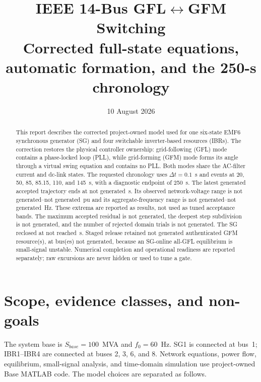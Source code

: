 \documentclass[12pt,a4paper]{article}
\title{\textbf{IEEE 14-Bus GFL$\leftrightarrow$GFM Switching}\\
\large Corrected full-state equations, automatic formation, and the 250-s chronology}
\author{}
\date{10 August 2026}
\newcommand{\RunEnd}{not generated}
\newcommand{\RunVMin}{not generated}
\newcommand{\RunVMax}{not generated}
\newcommand{\RunFMin}{not generated}
\newcommand{\RunFMax}{not generated}
\newcommand{\RunSubdivision}{not generated}
\newcommand{\RunDomainRejects}{not generated}
\newcommand{\RunResidual}{not generated}
\newcommand{\RunReclose}{not reached}
\newcommand{\RunFinalGFMCount}{not generated}
\newcommand{\RunFinalGFMBuses}{not generated}
\begin{document}
\maketitle

\begin{abstract}
This report describes the corrected project-owned model used for one six-state EMF6 synchronous
generator (SG) and four switchable inverter-based resources (IBRs). The correction restores the
physical controller ownership: grid-following (GFL) mode contains a phase-locked loop (PLL), while
grid-forming (GFM) mode forms its angle through a virtual swing equation and contains no PLL.
Both modes share the AC-filter current and dc-link states. The requested chronology uses
$\Delta t=0.1$~s and events at 20, 50, 85, 85.15, 110, and 145~s, with a diagnostic endpoint of
250~s. The latest generated accepted trajectory ends at \RunEnd~s. Its observed network-voltage
range is \RunVMin--\RunVMax~pu and its aggregate-frequency range is
\RunFMin--\RunFMax~Hz. These extrema are reported as results, not used as tuned acceptance bands.
The maximum accepted residual is \RunResidual, the deepest step subdivision is
\RunSubdivision, and the number of rejected domain trials is \RunDomainRejects. The SG reclosed
at \RunReclose~s. Staged release retained \RunFinalGFMCount{} authenticated GFM resource(s), at
bus(es) \RunFinalGFMBuses, because an SG-online all-GFL equilibrium is small-signal unstable.
Numerical completion and operational readiness are reported separately; raw excursions are never
hidden or used to tune a gate.
\end{abstract}

\section{Scope, evidence classes, and non-goals}

The system base is $S_{base}=100$~MVA and $f_0=60$~Hz. SG1 is connected at bus~1;
IBR1--IBR4 are connected at buses 2, 3, 6, and 8. Network equations, power flow, equilibrium,
small-signal analysis, and time-domain simulation use project-owned Base MATLAB code. The model
choices are separated as follows.
\end{document}

